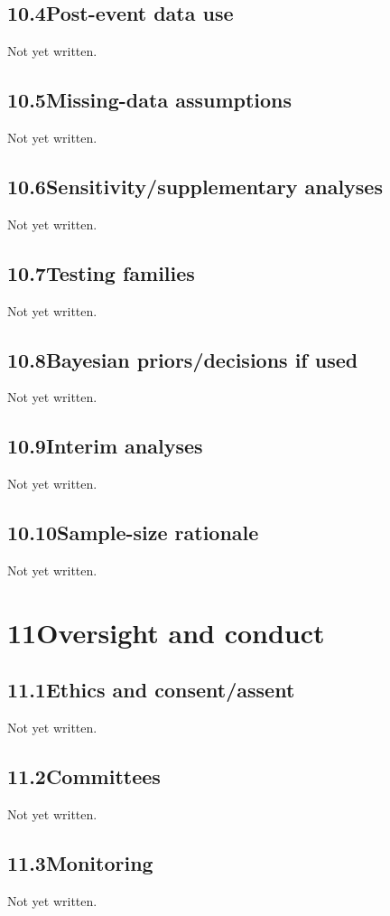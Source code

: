 \documentclass[11pt,a4paper]{article}
\newcommand{\psnote}[2]{\par\noindent\colorbox{#1!8}{\parbox{\dimexpr\linewidth-2\fboxsep}{\small\color{#1}#2}}\par}
\begin{document}
\subsection{10.4\quad Post-event data use}\label{section.10.4}
\psnote{pswarn}{Not yet written.}
\subsection{10.5\quad Missing-data assumptions}\label{section.10.5}
\psnote{pswarn}{Not yet written.}
\subsection{10.6\quad Sensitivity/supplementary analyses}\label{section.10.6}
\psnote{pswarn}{Not yet written.}
\subsection{10.7\quad Testing families}\label{section.10.7}
\psnote{pswarn}{Not yet written.}
\subsection{10.8\quad Bayesian priors/decisions if used}\label{section.10.8}
\psnote{pswarn}{Not yet written.}
\subsection{10.9\quad Interim analyses}\label{section.10.9}
\psnote{pswarn}{Not yet written.}
\subsection{10.10\quad Sample-size rationale}\label{section.10.10}
\psnote{pswarn}{Not yet written.}
\section{11\quad Oversight and conduct}\label{section.11}
\subsection{11.1\quad Ethics and consent/assent}\label{section.11.1}
\psnote{pswarn}{Not yet written.}
\subsection{11.2\quad Committees}\label{section.11.2}
\psnote{pswarn}{Not yet written.}
\subsection{11.3\quad Monitoring}\label{section.11.3}
\psnote{pswarn}{Not yet written.}
\end{document}
